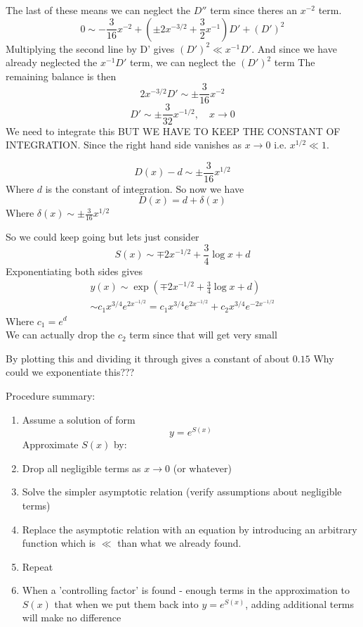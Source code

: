 \documentclass{X:/Documents/Coding/Latex/myassignment}
\begin{document}
The last of these means we can neglect the $D''$ term since theres an $x^{-2}$ term.
\[0\sim -\frac3{16} x^{-2} + (\pm2x ^{-3/2} + \frac32 x^{-1})D' + (D')^2\]
Multiplying the second line by D' gives $(D')^2 \ll x^{-1} D'$. And since we have already neglected the $x^{-1}D'$ term, we can neglect the $(D')^2$ term
The remaining balance is then
\[2x^{-3/2} D' \sim \pm \frac3{16} x^{-2}\]
\[D' \sim \pm \frac{3}{32} x^{-1/2}, \quad x\to 0\]
We need to integrate this BUT WE HAVE TO KEEP THE CONSTANT OF INTEGRATION. Since the right hand side vanishes as $x\to 0$ i.e. $x^{1/2} \ll 1$.

\[D(x) - d \sim \pm \frac{3}{16} x^{1/2}\]
Where $d$ is the constant of integration.
So now we have 
\[D(x) = d + \delta(x)\]
Where $\delta(x) \sim \pm \frac3{16} x^{1/2}$

So we could keep going but lets just consider
\[S(x) \sim \mp 2x^{-1/2} + \frac34 \log x + d\]
Exponentiating both sides gives
\begin{align*}
    y(x) \sim \exp\left(\mp 2x^{-1/2} + \frac34 \log x + d\right)\\
    \sim c_1 x^{3/4} e^{2x^{-1/2}} = c_1 x^{3/4} e^{2x^{-1/2}} + c_2 x^{3/4} e^{-2x^{-1/2}}
\end{align*}
Where $c_1 =e^d$\\
We can actually drop the $c_2$ term since that will get very small

By plotting this and dividing it through gives a constant of about $0.15$
Why could we exponentiate this???


Procedure summary:
\begin{enumerate}
    \item Assume a solution of form
    \[y= e^{S(x)}\]
    Approximate $S(x)$ by:
    \item Drop all negligible terms as $x\to 0$ (or whatever)
    \item Solve the simpler asymptotic relation (verify assumptions about negligible terms)
    \item Replace the asymptotic relation with an equation by introducing an arbitrary function which is $\ll$ than what we already found.
    \item Repeat
    \item When a 'controlling factor' is found - enough terms in the approximation to $S(x)$ that when we put them back into $y=e^{S(x)}$, adding additional terms will make no difference
\end{enumerate}
    
    
    
\end{document}
